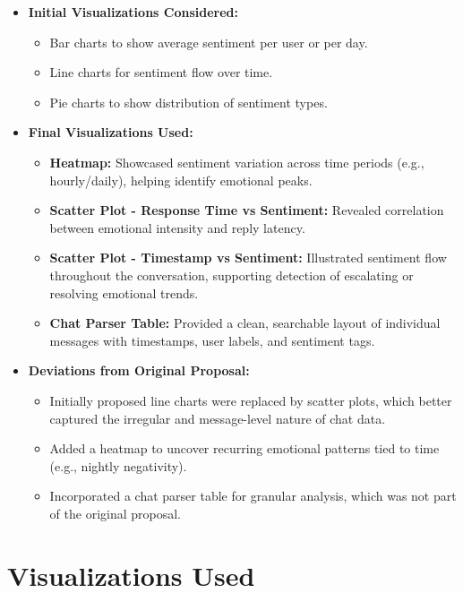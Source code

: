 \documentclass{article}\usepackage{graphicx}
\begin{document}
\begin{itemize}
    \item \textbf{Initial Visualizations Considered:}
    \begin{itemize}
        \item Bar charts to show average sentiment per user or per day.
        \item Line charts for sentiment flow over time.
        \item Pie charts to show distribution of sentiment types.
    \end{itemize}

    \item \textbf{Final Visualizations Used:}
    \begin{itemize}
        \item \textbf{Heatmap:} Showcased sentiment variation across time periods (e.g., hourly/daily), helping identify emotional peaks.
        \item \textbf{Scatter Plot - Response Time vs Sentiment:} Revealed correlation between emotional intensity and reply latency.
        \item \textbf{Scatter Plot - Timestamp vs Sentiment:} Illustrated sentiment flow throughout the conversation, supporting detection of escalating or resolving emotional trends.
        \item \textbf{Chat Parser Table:} Provided a clean, searchable layout of individual messages with timestamps, user labels, and sentiment tags.
    \end{itemize}

    

    \item \textbf{Deviations from Original Proposal:}
    \begin{itemize}
        \item Initially proposed line charts were replaced by scatter plots, which better captured the irregular and message-level nature of chat data.
        \item Added a heatmap to uncover recurring emotional patterns tied to time (e.g., nightly negativity).
        \item Incorporated a chat parser table for granular analysis, which was not part of the original proposal.
    \end{itemize}
\end{itemize}
 \section*{Visualizations Used}
\end{document}
